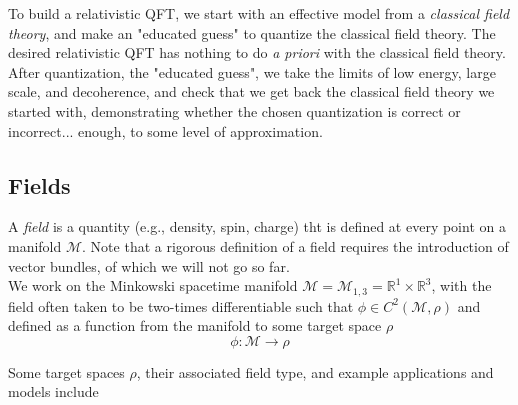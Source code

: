 \noindent To build a relativistic QFT, we start with an effective model from a \textit{classical field theory}, and make an "educated guess" to quantize the classical field theory. The desired relativistic QFT has nothing to do \textit{a priori} with the classical field theory. After quantization, the "educated guess", we take the limits of low energy, large scale, and decoherence, and check that we get back the classical field theory we started with, demonstrating whether the chosen quantization is correct or incorrect... enough, to some level of approximation.

\subsection*{Fields}

\noindent A \textit{field} is a quantity (e.g., density, spin, charge) tht is defined at every point on a manifold $\mathcal{M}$. Note that a rigorous definition of a field requires the introduction of vector bundles, of which we will not go so far. \\
We work on the Minkowski spacetime manifold $\mathcal{M} = \mathcal{M}_{1,3} = \mathbb{R}^1 \times \mathbb{R}^3$, with the field often taken to be two-times differentiable such that $\phi \in C^2(\mathcal{M}, \rho)$ and defined as a function from the manifold to some target space $\rho$
\begin{equation}
\phi : \mathcal{M} \rightarrow \rho 
\end{equation}

\noindent Some target spaces $\rho$, their associated field type, and example applications and models include

